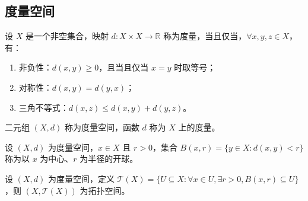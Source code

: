 

\vspace{1em}

\subsection{度量空间}
\begin{definition}
    设 $ X $ 是一个非空集合，映射 $ d:X\times X\to \mathbb{R} $ 称为度量，当且仅当，$ \forall x,y,z\in X $，有：
    \begin{enumerate}
        \item 非负性：$ d(x,y)\geq 0 $，且当且仅当 $ x=y $ 时取等号；
        \item 对称性：$ d(x,y)=d(y,x) $；
        \item 三角不等式：$ d(x,z)\leq d(x,y)+d(y,z) $。
    \end{enumerate}
    二元组 $ (X,d) $ 称为度量空间，函数 $ d $ 称为 $ X $ 上的度量。
\end{definition}
\vspace{1em}

\begin{definition}
    设 $ (X,d) $ 为度量空间，$ x\in X $ 且 $ r>0 $，集合 $ B(x,r)=\{y\in X:d(x,y)<r\} $ 称为以 $ x $ 为中心、$ r $ 为半径的开球。
\end{definition}
\vspace{1em}

\begin{proposition}[度量空间诱导的拓扑]
    设 $ (X,d) $ 为度量空间，定义 $ \mathcal{T}(X)=\{U\subseteq X:\forall x\in U,\exists r>0,B(x,r)\subseteq U\} $，则 $ (X,\mathcal{T}(X)) $ 为拓扑空间。
\end{proposition}
\vspace{1em}

